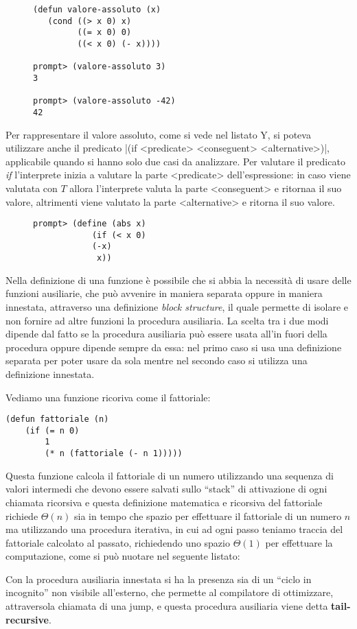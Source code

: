 \documentclass[a4paper]{book}
\begin{document}
\begin{figure}
\begin{verbatim}
(defun valore-assoluto (x)
   (cond ((> x 0) x)
         ((= x 0) 0)
         ((< x 0) (- x))))

prompt> (valore-assoluto 3)
3

prompt> (valore-assoluto -42)
42
\end{verbatim}
\end{figure}
Per rappresentare il valore assoluto, come si vede nel listato Y, si poteva utilizzare anche il predicato 
|(if <predicate> <conseguent> <alternative>)|, applicabile quando si hanno solo due casi da analizzare.\newline
Per valutare il predicato \emph{if} l'interprete inizia a valutare la parte <predicate> dell'espressione: in caso viene valutata con $T$
allora l'interprete valuta la parte <conseguent> e ritornaa il suo valore, altrimenti viene valutato la parte <alternative> e ritorna il suo valore.

\begin{figure}
\begin{verbatim}
prompt> (define (abs x)
            (if (< x 0)
            (-x)
             x))
\end{verbatim}
\end{figure}
Nella definizione di una funzione è possibile che si abbia la necessità di usare delle funzioni ausiliarie, che può avvenire in maniera separata
oppure in maniera innestata, attraverso una definizione \emph{block structure}, il quale permette di isolare e non fornire ad altre funzioni
la procedura ausiliaria.\newline
La scelta tra i due modi dipende dal fatto se la procedura ausiliaria può essere usata all'in fuori della procedura oppure dipende sempre da essa:
nel primo caso si usa una definizione separata per poter usare da sola mentre nel secondo caso si utilizza una definizione innestata.

Vediamo una funzione ricoriva come il fattoriale:
\begin{verbatim}
(defun fattoriale (n)
    (if (= n 0)
        1
        (* n (fattoriale (- n 1)))))
\end{verbatim}
Questa funzione calcola il fattoriale di un numero utilizzando una sequenza di valori intermedi che devono essere salvati sullo ``stack''
di attivazione di ogni chiamata ricorsiva e questa definizione matematica e ricorsiva del fattoriale richiede $\Theta(n)$ sia in tempo che spazio
per effettuare il fattoriale di un numero $n$ ma utilizzando una procedura iterativa, in cui ad ogni passo teniamo traccia del fattoriale
calcolato al passato, richiedendo uno spazio $\Theta(1)$ per effettuare la computazione, come si può nuotare nel seguente listato:
\begin{figure}
\end{figure}
Con la procedura ausiliaria innestata  si ha la presenza sia di un ``ciclo in incognito'' non visibile all'esterno, che permette al compilatore di
ottimizzare, attraversola chiamata di una jump, e questa procedura ausiliaria viene detta \textbf{tail-recursive}.
\end{document}
